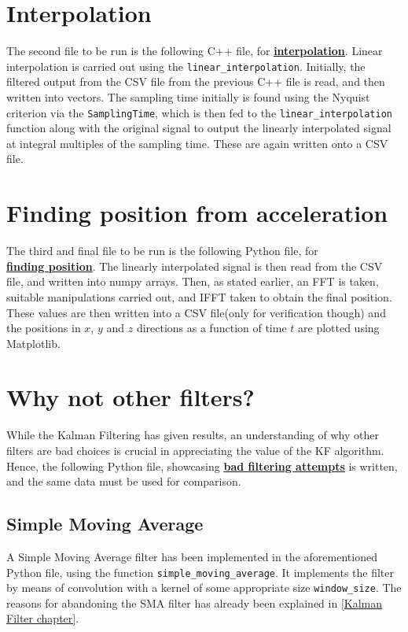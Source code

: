 \documentclass[oneside]{book}
\begin{document}
\section{Interpolation}
The second file to be run is the following C++ file, for \href{https://github.com/HarryNyquist/Odometry/blob/main/Codes/2_DataFunctions.cpp}{\textbf{\underline{interpolation}}}. Linear interpolation is carried out using the \verb|linear_interpolation|. Initially, the filtered output from the CSV file from the previous C++ file is read, and then written into vectors. The sampling time initially is found using the Nyquist criterion via the \verb|SamplingTime|, which is then fed to the \verb|linear_interpolation| function along with the original signal to output the linearly interpolated signal at integral multiples of the sampling time. These are again written onto a CSV file. \\
\bigskip
\section{Finding position from acceleration}
The third and final file to be run is the following Python file, for \\
\href{https://github.com/HarryNyquist/Odometry/blob/main/Codes/3_Data_analysis.py}{\textbf{\underline{finding position}}}. The linearly interpolated signal is then read from the CSV file, and written into numpy arrays. Then, as stated earlier, an FFT is taken, suitable manipulations carried out, and IFFT taken to obtain the final position. These values are then written into a CSV file(only for verification though) and the positions in $x$, $y$ and $z$ directions as a function of time $t$ are plotted using Matplotlib.\\
\bigskip
\section{Why not other filters?}
While the Kalman Filtering has given results, an understanding of why other filters are bad choices is crucial in appreciating the value of the KF algorithm. Hence, the following Python file, showcasing \href{https://github.com/HarryNyquist/Odometry/blob/main/Odometry_Bad_Tries/Bad_Filter_attempts.py}{\textbf{\underline{bad filtering attempts}}} is written, and the same data must be used for comparison. \\
\subsection{Simple Moving Average}
A Simple Moving Average filter has been implemented in the aforementioned Python file, using the function \verb|simple_moving_average|. It implements the filter by means of convolution with a kernel of some appropriate size \verb|window_size|. The reasons for abandoning the SMA filter has already been explained in \autoref{Kalman Filter chapter}.\\
\end{document}

